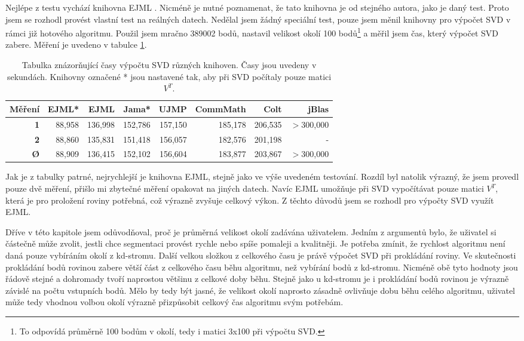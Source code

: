 \documentclass[11pt,twoside,a4paper]{book}
\begin{document}
Nejlépe z testu vychází knihovna EJML \cite{svdlib}. Nicméně je nutné poznamenat, že tato knihovna je od stejného autora, jako je daný test. Proto jsem se rozhodl provést vlastní test na reálných datech. Nedělal jsem žádný speciální test, pouze jsem měnil knihovny pro výpočet SVD v rámci již hotového algoritmu. Použil jsem mračno 389002 bodů, nastavil velikost okolí 100 bodů\footnote{To odpovídá průměrně 100 bodům v okolí, tedy i matici 3x100 při výpočtu SVD.} a měřil jsem čas, který výpočet SVD zabere. Měření je uvedeno v tabulce \ref{table:svdlib}.

\begin{table}[ht]
\resizebox{\textwidth}{!} {
\begin{tabular}{|r|r|r|r|r|r|r|r|}
\hline
\textbf{Měření} & \textbf{EJML*} & \textbf{EJML} & \textbf{Jama*} & \textbf{UJMP} & \textbf{CommMath} & \textbf{Colt} & \textbf{jBlas} \\ \hline
\textbf{1} & 88,958 & 136,998 & 152,786 & 157,150 & 185,178 & 206,535 & $>$300,000 \\ \hline
\textbf{2} & 88,860 & 135,831 & 151,418 & 156,057 & 182,576 & 201,198 & - \\ \hline
\textbf{Ø} & 88,909 & 136,415 & 152,102 & 156,604 & 183,877 & 203,867 & $>$300,000 \\ \hline
\end{tabular}
}
\caption{Tabulka znázorňující časy výpočtu SVD různých knihoven. Časy jsou uvedeny v sekundách. Knihovny označené * jsou nastavené tak, aby při SVD počítaly pouze matici $V^T$.} 
\label{table:svdlib}
\end{table}

Jak je z tabulky patrné, nejrychlejší je knihovna EJML, stejně jako ve výše uvedeném testování. Rozdíl byl natolik výrazný, že jsem provedl pouze dvě měření, přišlo mi zbytečné měření opakovat na jiných datech. Navíc EJML umožňuje při SVD vypočítávat pouze matici $V^T$, která je pro proložení roviny potřebná, což výrazně zvyšuje celkový výkon. Z těchto důvodů jsem se rozhodl pro výpočty SVD využít EJML.

Dříve v této kapitole jsem odůvodňoval, proč je průměrná velikost okolí zadávána uživatelem. Jedním z argumentů bylo, že uživatel si částečně může zvolit, jestli chce segmentaci provést rychle nebo spíše pomaleji a kvalitněji. Je potřeba zmínit, že rychlost algoritmu není daná pouze vybíráním okolí z kd-stromu. Další velkou složkou z celkového času je právě výpočet SVD při prokládání roviny. Ve skutečnosti prokládání bodů rovinou zabere větší část z celkového času běhu algoritmu, než vybírání bodů z kd-stromu. Nicméně obě tyto hodnoty jsou řádově stejné a dohromady tvoří naprostou většinu z celkové doby běhu. Stejně jako u kd-stromu je i prokládání bodů rovinou je výrazně závislé na počtu vstupních bodů. Mělo by tedy být jasné, že velikost okolí naprosto zásadně ovlivňuje dobu běhu celého algoritmu, uživatel může tedy vhodnou volbou okolí výrazně přizpůsobit celkový čas algoritmu svým potřebám.
\end{document}
